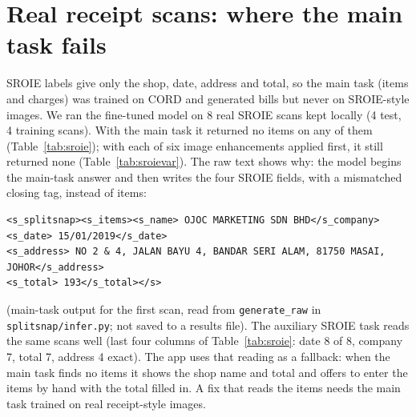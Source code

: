 \begin{table}[!ht]\centering\footnotesize

\caption{Misread unit prices (first nine of the saved examples).}\label{tab:exs}
\end{table}

\section{Real receipt scans: where the main task fails}\label{app:sroie}
SROIE labels give only the shop, date, address and total, so the main task (items and charges) was trained on CORD and generated bills but never on SROIE-style images. We ran the fine-tuned model on 8 real SROIE scans kept locally (4 test, 4 training scans). With the main task it returned no items on any of them (Table~\ref{tab:sroie}); with each of six image enhancements applied first, it still returned none (Table~\ref{tab:sroievar}). The raw text shows why: the model begins the main-task answer and then writes the four SROIE fields, with a mismatched closing tag, instead of items:

\begin{center}\begin{minipage}{0.95\textwidth}\scriptsize\begin{verbatim}
<s_splitsnap><s_items><s_name> OJOC MARKETING SDN BHD</s_company>
<s_date> 15/01/2019</s_date>
<s_address> NO 2 & 4, JALAN BAYU 4, BANDAR SERI ALAM, 81750 MASAI, JOHOR</s_address>
<s_total> 193</s_total></s>
\end{verbatim}\end{minipage}\end{center}
(main-task output for the first scan, read from \texttt{generate\_raw} in \texttt{splitsnap/infer.py}; not saved to a results file). The auxiliary SROIE task reads the same scans well (last four columns of Table~\ref{tab:sroie}: date 8 of 8, company 7, total 7, address 4 exact). The app uses that reading as a fallback: when the main task finds no items it shows the shop name and total and offers to enter the items by hand with the total filled in. A fix that reads the items needs the main task trained on real receipt-style images.

\begin{table}[!ht]\centering\footnotesize\setlength{\tabcolsep}{4pt}

\caption{Eight real SROIE scans: main-task items and auxiliary-task exact matches.}\label{tab:sroie}
\end{table}
\begin{table}[!ht]\centering\footnotesize

\caption{Scans for which the main task returned any item, by enhancement applied before reading.}\label{tab:sroievar}
\end{table}


